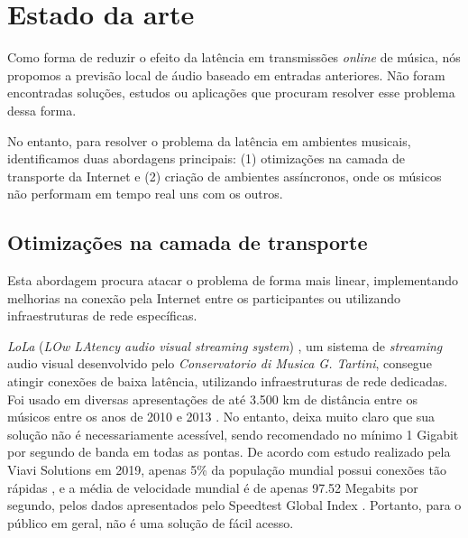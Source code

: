 \section{Estado da arte}


Como forma de reduzir o efeito da latência em transmissões \textit{online} de música, nós propomos a previsão local de áudio baseado em entradas anteriores. Não foram encontradas soluções, estudos ou aplicações que procuram resolver esse problema dessa forma.

No entanto, para resolver o problema da latência em ambientes musicais, identificamos duas abordagens principais: (1) otimizações na camada de transporte da Internet e (2) criação de ambientes assíncronos, onde os músicos não performam em tempo real uns com os outros.

\subsection{Otimizações na camada de transporte}
\label{sec:delay-based-audio-solutions}

Esta abordagem procura atacar o problema de forma mais linear, implementando melhorias na conexão pela Internet entre os participantes ou utilizando infraestruturas de rede específicas.

\textit{LoLa} (\textit{LOw LAtency audio visual streaming system}) \cite{lola}, um sistema de \textit{streaming} audio visual desenvolvido pelo \textit{Conservatorio di Musica G. Tartini}, consegue atingir conexões de baixa latência, utilizando infraestruturas de rede dedicadas. Foi usado em diversas apresentações de até 3.500 km de distância entre os músicos entre os anos de 2010 e 2013 \cite{lola_streaming}. No entanto, deixa muito claro que sua solução não é necessariamente acessível, sendo recomendado no mínimo 1 Gigabit por segundo de banda em todas as pontas. De acordo com estudo realizado pela Viavi Solutions em 2019, apenas 5\% da população mundial possui conexões tão rápidas \cite{1gbps}, e a média de velocidade mundial é de apenas 97.52 Megabits por segundo, pelos dados apresentados pelo Speedtest Global Index \cite{speed_test}. Portanto, para o público em geral, não é uma solução de fácil acesso.

